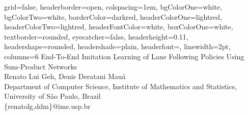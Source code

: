 \documentclass[a0paper,portrait]{baposter}
\begin{document}

\begin{poster}
{
grid=false,
headerborder=open, %
colspacing=1em, %
bgColorOne=white, %
bgColorTwo=white, %
borderColor=darkred, %
headerColorOne=lightred, %
headerColorTwo=lightred, %
headerFontColor=white, %
boxColorOne=white, %
textborder=rounded, %
eyecatcher=false, %
headerheight=0.11\textheight, %
headershape=rounded, %
headershade=plain,
headerfont=\Large\textsf, %
linewidth=2pt, %
columns=6
}
{}
%
%
{
\textsf %
{End-To-End Imitation Learning of Lane Following Policies Using Sum-Product Networks
}
}
{\sf\vspace{0.01em}\\
Renato Lui Geh, Denis Deratani Mauá
\vspace{0.1em}\\
\small{Department of Computer Science, Institute of Mathematics and Statistics, University of São
  Paulo, Brazil
\vspace{0.2em}\\
\{renatolg,ddm\}@ime.usp.br}
}

\end{poster}
\end{document}
